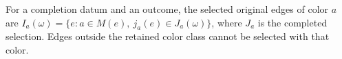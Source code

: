 \begin{definition}
For a completion datum and an outcome, the selected original edges of
color $a$ are $I_a(\omega)=\{e:a\in M(e),\ j_a(e)\in J_a(\omega)\}$,
where $J_a$ is the completed selection. Edges outside the retained color
class cannot be selected with that color.
\end{definition}
